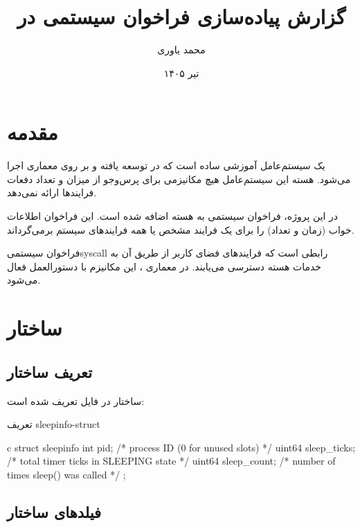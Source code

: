 \documentclass[code]{amznotes-fa}
\title{گزارش پیاده‌سازی فراخوان سیستمی \lr{getsleepinfo} در \lr{xv6-riscv}}
\author{محمد یاوری}
\date{تیر ۱۴۰۵}
\begin{document}
\maketitle
\tableofcontents
\newpage

\chapter{مقدمه}

 یک سیستم‌عامل آموزشی ساده است که در  توسعه یافته و بر روی معماری  اجرا می‌شود. هسته این سیستم‌عامل هیچ مکانیزمی برای پرس‌وجو از میزان و تعداد دفعات  فرایندها ارائه نمی‌دهد.

در این پروژه، فراخوان سیستمی  به هسته  اضافه شده است. این فراخوان اطلاعات خواب (زمان و تعداد) را برای یک فرایند مشخص یا همه فرایندهای سیستم برمی‌گرداند.

\begin{dfnbox}{فراخوان سیستمی}{syscall}
     رابطی است که فرایندهای فضای کاربر از طریق آن به خدمات هسته دسترسی می‌یابند. در معماری ، این مکانیزم با دستورالعمل  فعال می‌شود.
\end{dfnbox}

\chapter{ساختار }

\section{تعریف ساختار}

ساختار  در فایل  تعریف شده است:

\begin{codebox}{تعریف }{sleepinfo-struct}
    \begin{amzcode}{c}
struct sleepinfo {
  int    pid;          /* process ID (0 for unused slots) */
  uint64 sleep_ticks;  /* total timer ticks in SLEEPING state */
  uint64 sleep_count;  /* number of times sleep() was called  */
};
    \end{amzcode}
\end{codebox}

\section{فیلدهای ساختار}
\end{document}
